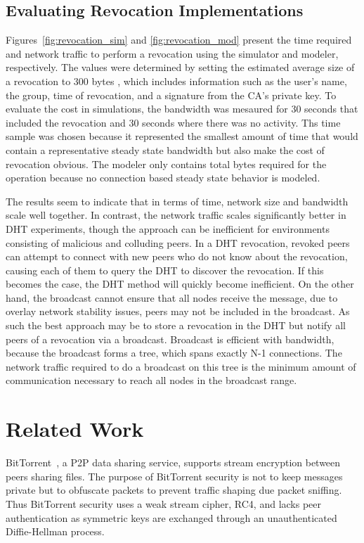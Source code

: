 \subsection{Evaluating Revocation Implementations}
\label{evaluation_revocation}
Figures~\ref{fig:revocation_sim} and \ref{fig:revocation_mod} present the time
required and network traffic to perform a revocation using the simulator and
modeler, respectively.  The values were determined by setting the estimated
average size of a revocation to 300 bytes , which includes information such as
the user's name, the group, time of revocation, and a signature from the CA's
private key.  To evaluate the cost in simulations, the bandwidth was mesaured
for 30 seconds that included the revocation and 30 seconds where there was no
activity.  Ths time sample was chosen because it represented the smallest
amount of time that would contain a representative steady state bandwidth but
also make the cost of revocation obvious.  The modeler only contains total
bytes required for the operation because no connection based steady state
behavior is modeled.

The results seem to indicate that in terms of time, network size and bandwidth
scale well together.  In contrast, the network traffic scales significantly
better in DHT experiments, though the approach can be inefficient for
environments consisting of malicious and colluding peers.  In a DHT revocation,
revoked peers can attempt to connect with new peers who do not know about the
revocation, causing each of them to query the DHT to discover the revocation.
If this becomes the case, the DHT method will quickly become inefficient.  On
the other hand, the broadcast cannot ensure that all nodes receive the message,
due to overlay network stability issues, peers may not be included in the
broadcast.  As such the best approach may be to store a revocation in the DHT
but notify all peers of a revocation via a broadcast.  Broadcast is efficient
with bandwidth, because the broadcast forms a tree, which spans exactly N-1
connections.  The network traffic required to do a broadcast on this tree is
the  minimum amount of communication necessary to reach all nodes in the
broadcast range.

\section{Related Work}
BitTorrent~\cite{bittorrent_security}, a P2P data sharing service,  supports
stream encryption between peers sharing files.  The purpose of BitTorrent
security is not to keep messages private but to obfuscate packets to
prevent traffic shaping due packet sniffing. Thus BitTorrent security uses a
weak stream cipher, RC4, and lacks peer authentication as symmetric keys are
exchanged through an unauthenticated Diffie-Hellman process.

